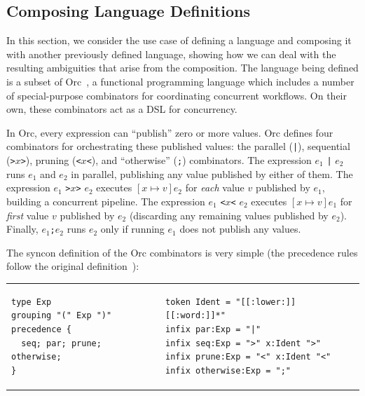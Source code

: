 \documentclass[acmsmall,review,anonymous]{acmart}\settopmatter{printfolios=true,printccs=false,printacmref=false}
\newcommand{\ocaml}{\lstinline[language={[objective]caml}]}
\begin{document}

\subsection{Composing Language Definitions} \label{sec:evaluation-orc}

In this section, we consider the use case of defining a language
and composing it with another previously defined language, showing
how we can deal with the resulting ambiguities that arise from the
composition.
%
The language being defined is a subset of
Orc~\cite{kitchinOrc2009}, a functional programming language which
includes a number of special-purpose combinators for coordinating
concurrent workflows. On their own, these combinators act as a DSL
for concurrency.

In Orc, every expression can ``publish'' zero or more values. Orc
defines four combinators for orchestrating these published values:
the parallel (\ocaml{|}), sequential (\ocaml{>}$x$\ocaml{>}),
pruning (\ocaml{<}$x$\ocaml{<}), and ``otherwise'' (\ocaml{;})
combinators.
%
The expression $e_1$ \ocaml{|} $e_2$ runs $e_1$ and
$e_2$ in parallel, publishing any value published by either of
them.
%
The expression $e_1$ \ocaml{>}$x$\ocaml{>} $e_2$ executes
$[x\mapsto v]e_2$ for \emph{each} value $v$ published by $e_1$,
building a concurrent pipeline.
%
The expression $e_1$ \ocaml{<}$x$\ocaml{<} $e_2$ executes
$[x\mapsto v]e_1$ for \emph{first} value $v$ published by $e_2$
(discarding any remaining values published by $e_2$).
%
Finally, $e_1$\ocaml{;}$e_2$ runs $e_2$ only if running $e_1$ does
not publish any values.

The syncon definition of the Orc combinators is very simple (the
precedence rules follow the original
definition~\cite{kitchinOrc2009}):

\begin{tabular}{ll}
\small
\begin{lstlisting}[language=syncon,boxpos=t]
type Exp
grouping "(" Exp ")"
precedence {
  seq; par; prune; otherwise;
}
\end{lstlisting}
&
\small
\begin{lstlisting}[language=syncon,boxpos=t]
token Ident = "[[:lower:]][[:word:]]*"
infix par:Exp = "|"
infix seq:Exp = ">" x:Ident ">"
infix prune:Exp = "<" x:Ident "<"
infix otherwise:Exp = ";"
\end{lstlisting}
\end{tabular}\smallskip
\end{document}
